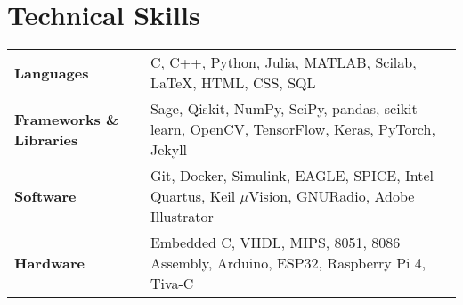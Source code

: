 \documentclass[10pt,a4paper,sans]{moderncv}        %
\begin{document}
\section{Technical Skills}
\setlength\tabcolsep{0.3em}
\vspace{-0.3em}
\hspace{-5pt}
\begin{tabular}{p{1.5in}p{5.5in}}
\textbf{Languages}& C, C++, Python, Julia, MATLAB, Scilab, \LaTeX, HTML, CSS,  SQL\\
\textbf{Frameworks \& Libraries}& Sage, Qiskit, NumPy, SciPy, pandas, scikit-learn, OpenCV, TensorFlow, Keras, PyTorch, Jekyll\\%
\textbf{Software}& Git, Docker, Simulink, EAGLE, SPICE, Intel Quartus, Keil $\mu$Vision, GNURadio, Adobe Illustrator\\%
\textbf{Hardware}& Embedded C, VHDL, MIPS, 8051, 8086 Assembly, Arduino, ESP32, Raspberry Pi 4, Tiva-C%
\end{tabular}
\end{document}
